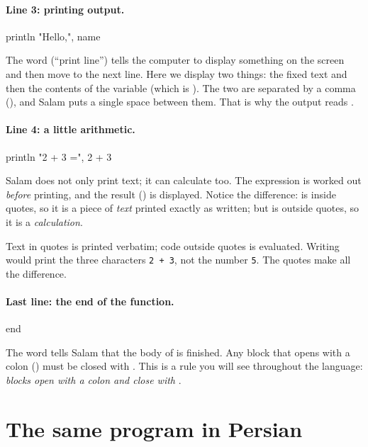 \paragraph{Line 3: printing output.}
\begin{salamen}
    println "Hello,", name
\end{salamen}
The word  (``print line'') tells the computer to display something
on the screen and then move to the next line. Here we display two things: the
fixed text  and then the contents of the variable 
(which is ). The two are separated by a comma (\code{,}), and Salam
puts a single space between them. That is why the output reads
.

\paragraph{Line 4: a little arithmetic.}
\begin{salamen}
    println "2 + 3 =", 2 + 3
\end{salamen}
Salam does not only print text; it can calculate too. The expression
 is worked out \emph{before} printing, and the result () is
displayed. Notice the difference:  is inside quotes, so it is a
piece of \emph{text} printed exactly as written; but  is outside
quotes, so it is a \emph{calculation}.

\begin{warn}
Text in quotes is printed verbatim; code outside quotes is evaluated. Writing
 would print the three characters \texttt{2 + 3}, not the
number \texttt{5}. The quotes make all the difference.
\end{warn}

\paragraph{Last line: the end of the function.}
\begin{salamen}
end
\end{salamen}
The word  tells Salam that the body of  is finished. Any
block that opens with a colon (\code{:}) must be closed with . This is
a rule you will see throughout the language: \emph{blocks open with a colon and
close with} .

\section{The same program in Persian}

